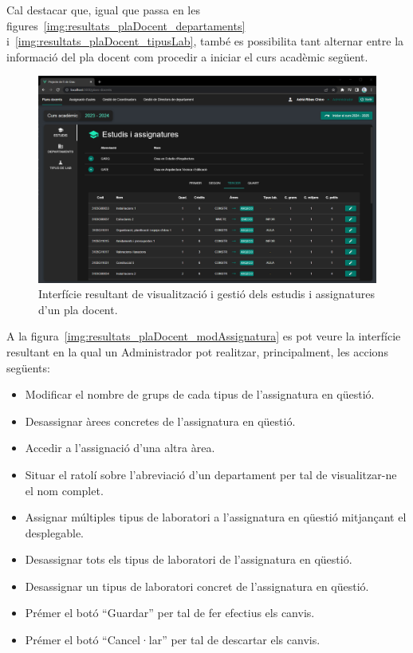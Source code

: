 \documentclass[a4paper,12pt]{ThesisStyle}
\begin{document}
Cal destacar que, igual que passa en les figures~\ref{img:resultats_plaDocent_departaments} i~\ref{img:resultats_plaDocent_tipusLab}, també es possibilita tant alternar entre la informació del pla docent com procedir a iniciar el curs acadèmic següent.

\begin{figure}[H]
  \centering
  \includegraphics[width=\textwidth]{assets/results/plaDocent/estudis.png}
  \caption{\label{img:resultats_plaDocent_estudis} Interfície resultant de visualització i gestió dels estudis i assignatures d'un pla docent.}
\end{figure}

\newpage

A la figura~\ref{img:resultats_plaDocent_modAssignatura} es pot veure la interfície resultant en la qual un Administrador pot realitzar, principalment, les accions següents:
\begin{itemize}
  \item Modificar el nombre de grups de cada tipus de l'assignatura en qüestió.
  \item Desassignar àrees concretes de l'assignatura en qüestió.
  \item Accedir a l'assignació d'una altra àrea.
  \item Situar el ratolí sobre l'abreviació d'un departament per tal de visualitzar-ne el nom complet.
  \item Assignar múltiples tipus de laboratori a l'assignatura en qüestió mitjançant el desplegable.
  \item Desassignar tots els tipus de laboratori de l'assignatura en qüestió.
  \item Desassignar un tipus de laboratori concret de l'assignatura en qüestió.
  \item Prémer el botó ``Guardar'' per tal de fer efectius els canvis.
  \item Prémer el botó ``Cancel·lar'' per tal de descartar els canvis.
\end{itemize}
\end{document}
